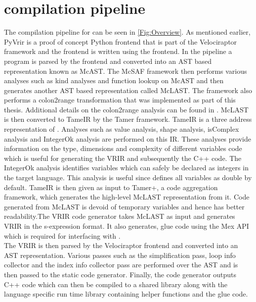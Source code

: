 \section{\velocty compilation pipeline}
The compilation pipeline for \velocty can be seen in \ref{Fig:Overview}. As mentioned earlier, PyVrir is a proof of concept Python\cite{python} frontend that is part of the Velociraptor\cite{velociraptor} framework and the \matlab\cite{matlab} frontend is written using the \mclab frontend. In the \mclab pipeline a \matlab\cite{matlab} program is parsed by the \mclab frontend and converted into an AST based representation known as McAST. The McSAF\cite{doherty11} framework then performs various analyses such as kind analyses and function lookup on McAST and then generates another AST based representation called McLAST. The framework also performs a colon2range transformation that was implemented as part of this thesis. Additional details on the colon2range analysis can be found in . McLAST is then converted to TameIR\cite{Dubrau:2012} by the Tamer\cite{Dubrau:2012} framework. TameIR\cite{Dubrau:2012} is a three address representation of \matlab\cite{matlab}. Analyses such as value analysis, shape analysis, isComplex analysis and IntegerOk analysis are performed on this IR. These analyses provide information on the type, dimensions and complexity of different variables code which is useful for generating the VRIR and subsequently the C++ code. The IntegerOk analysis identifies variables which can safely be declared as integers in the target language. This analysis is useful since \matlab\cite{matlab} defines all variables as double by default. TameIR\cite{Dubrau:2012} is then given as input to Tamer+, a code aggregation framework, which generates the high-level McLAST representation from it. Code generated from McLAST is devoid of temporary variables and hence has better readability.The VRIR code generator takes McLAST as input and generates VRIR in the s-expression format. It also generates, glue code using the \matlab\cite{matlab} Mex\cite{mex} API which is required for interfacing with \matlab\cite{matlab}.\\ 
The VRIR is then parsed by the Velociraptor\cite{velociraptor} frontend and converted into an AST representation. Various passes such as the simplification pass, loop info collector and the index info collector pass are performed over the AST and is then passed to the static code generator. Finally, the code generator outputs C++ code which can then be compiled to a shared library along with the language specific run time library containing helper functions and the glue code. 
